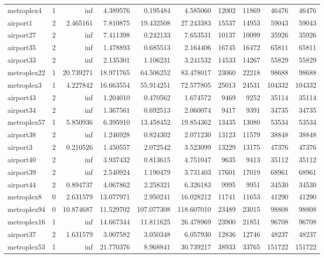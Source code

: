\begin{longtable}{|l|r|r|r|r|r|r|r|r|r|}
metroplex4 & 1 & inf & 4.389576 & 0.195484 & 4.585060 & 12002 & 11869 & 46476 & 46476 \\
airport1 & 2 & 2.465161 & 7.810875 & 19.432508 & 27.243383 & 15537 & 14953 & 59043 & 59043 \\
airport27 & 2 & inf & 7.411398 & 0.242133 & 7.653531 & 10137 & 10099 & 35926 & 35926 \\
airport35 & 2 & inf & 1.478893 & 0.685513 & 2.164406 & 16745 & 16472 & 65811 & 65811 \\
airport33 & 2 & inf & 2.135301 & 1.106231 & 3.241532 & 14533 & 14267 & 55829 & 55829 \\
metroplex22 & 1 & 20.739271 & 18.971765 & 64.506252 & 83.478017 & 23060 & 22218 & 98688 & 98688 \\
metroplex3 & 1 & 4.227842 & 16.663554 & 55.914251 & 72.577805 & 25013 & 24531 & 104332 & 104332 \\
airport43 & 2 & inf & 1.204010 & 0.470562 & 1.674572 & 9469 & 9252 & 35114 & 35114 \\
airport34 & 2 & inf & 1.367561 & 0.692513 & 2.060074 & 9417 & 9391 & 34735 & 34735 \\
metroplex57 & 1 & 5.850936 & 6.395910 & 13.458452 & 19.854362 & 13435 & 13080 & 53534 & 53534 \\
airport38 & 2 & inf & 1.246928 & 0.824302 & 2.071230 & 13123 & 11579 & 38848 & 38848 \\
airport3 & 2 & 0.210526 & 1.450557 & 2.072542 & 3.523099 & 13229 & 13175 & 47376 & 47376 \\
airport40 & 2 & inf & 3.937432 & 0.813615 & 4.751047 & 9635 & 9413 & 35112 & 35112 \\
airport39 & 2 & inf & 2.540924 & 1.190479 & 3.731403 & 17601 & 17019 & 68961 & 68961 \\
airport44 & 2 & 0.894737 & 4.067862 & 2.258321 & 6.326183 & 9995 & 9951 & 34530 & 34530 \\
metroplex8 & 0 & 2.631579 & 13.077971 & 2.950241 & 16.028212 & 11741 & 11653 & 41290 & 41290 \\
metroplex94 & 0 & 10.874687 & 11.529702 & 107.077308 & 118.607010 & 23489 & 23015 & 98808 & 98808 \\
metroplex16 & 1 & inf & 14.667344 & 11.811625 & 26.478969 & 23900 & 21851 & 96708 & 96708 \\
airport37 & 2 & 1.631579 & 3.007582 & 3.050348 & 6.057930 & 12836 & 12746 & 48237 & 48237 \\
metroplex53 & 1 & inf & 21.770376 & 8.968841 & 30.739217 & 38933 & 33765 & 151722 & 151722 \\

\end{longtable}

